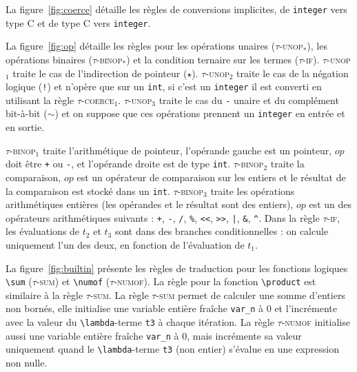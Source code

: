 La figure~\ref{fig:coerce} détaille les règles de conversions implicites, de
\lstinline'integer' vers type C et de type C vers \lstinline'integer'.

La figure~\ref{fig:op} détaille les règles pour les opérations unaires
(\textsc{$\tau$-unop$_{*}$}), les opérations binaires
(\textsc{$\tau$-binop$_{*}$}) et la condition ternaire sur les termes
(\textsc{$\tau$-if}).
\textsc{$\tau$-unop$_1$} traite le cas de l'indirection de pointeur ($\star$).
\textsc{$\tau$-unop$_2$} traite le cas de la négation logique (\lstinline|!|) et
n'opère que sur un \lstinline'int', si c'est un \lstinline'integer' il est
converti en utilisant la règle \textsc{$\tau$-coerce$_1$}.
\textsc{$\tau$-unop$_3$} traite le cas du \lstinline|-| unaire et du complément
bit-à-bit ($\sim$) et on suppose que ces opérations prennent un
\lstinline'integer' en entrée et en sortie.

\textsc{$\tau$-binop$_1$} traite l'arithmétique de pointeur, l'opérande gauche
est un pointeur, $op$ doit être \lstinline|+| ou \lstinline|-|, et l'opérande
droite est de type \lstinline'int'.
\textsc{$\tau$-binop$_2$} traite la comparaison, $op$ est un opérateur de
comparaison sur les entiers et le résultat de la comparaison est stocké dans un
\lstinline|int|.
\textsc{$\tau$-binop$_3$} traite les opérations arithmétiques entières (les
opérandes et le résultat sont des entiers), $op$ est un des opérateurs
arithmétiques suivants : \lstinline|+|, \lstinline|-|, \lstinline|/|,
\lstinline|%|, \lstinline|<<|, \lstinline|>>|, \lstinline{|}, \lstinline|&|,
\lstinline|^|.
Dans la règle \textsc{$\tau$-if}, les évaluations de $t_2$ et $t_3$ sont dans
des branches conditionnelles : on calcule uniquement l'un des deux, en fonction
de l'évaluation de $t_1$.

La figure~\ref{fig:builtin} présente les règles de traduction pour les fonctions
logiques \lstinline|\sum| (\textsc{$\tau$-sum}) et \lstinline|\numof|
(\textsc{$\tau$-numof}).
La règle pour la fonction \lstinline|\product| est similaire à la règle
\textsc{$\tau$-sum}.
La règle \textsc{$\tau$-sum} permet de calculer une somme d'entiers non bornés,
elle initialise une variable entière fraîche \lstinline|var_n| à $0$ et
l'incrémente avec la valeur du \lstinline|\lambda|-terme \lstinline't3' à chaque
itération.
La règle \textsc{$\tau$-numof} initialise aussi une variable entière fraîche
\lstinline|var_n| à $0$, mais incrémente sa valeur uniquement quand le
\lstinline|\lambda|-terme \lstinline't3' (non entier) s'évalue en une expression
non nulle.



